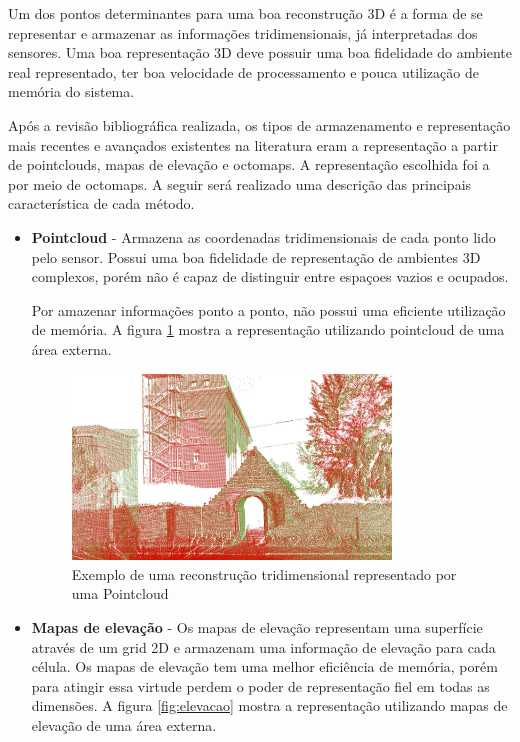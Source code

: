 Um dos pontos determinantes para uma boa reconstrução 3D é a forma de se representar e armazenar as informações tridimensionais, já interpretadas dos sensores. Uma boa representação 3D deve possuir uma boa fidelidade do ambiente real representado, ter boa velocidade de processamento e pouca utilização de memória do sistema.

Após a revisão bibliográfica realizada, os tipos de armazenamento e representação mais recentes e avançados existentes na literatura eram a representação a partir de pointclouds, mapas de elevação e octomaps. A representação escolhida foi a por meio de octomaps. A seguir será realizado uma descrição das principais característica de cada método.
\begin{itemize}
    \item \textbf{Pointcloud} - Armazena as coordenadas tridimensionais de cada ponto lido pelo sensor. Possui uma boa fidelidade de representação de ambientes 3D complexos, porém não é capaz de distinguir entre espaçoes vazios e ocupados.

    Por amazenar informações ponto a ponto, não possui uma eficiente utilização de memória. A figura \ref{fig:pointcloud} mostra a representação utilizando pointcloud de uma área externa.

    \begin{figure}[H]
    \centering
    \includegraphics[width=0.8\textwidth]{figs/3d/registration_closeup}
    \caption{Exemplo de uma reconstrução tridimensional representado por uma Pointcloud}
    \label{fig:pointcloud}
\end{figure}


    \item \textbf{Mapas de elevação} - Os mapas de elevação representam uma superfície através de um grid 2D e armazenam uma informação de elevação para cada célula. Os mapas de elevação tem uma melhor eficiência de memória, porém para atingir essa virtude perdem o poder de representação fiel em todas as dimensões. A figura \ref{fig:elevacao} mostra a representação utilizando mapas de elevação de uma área externa.


\end{itemize}
